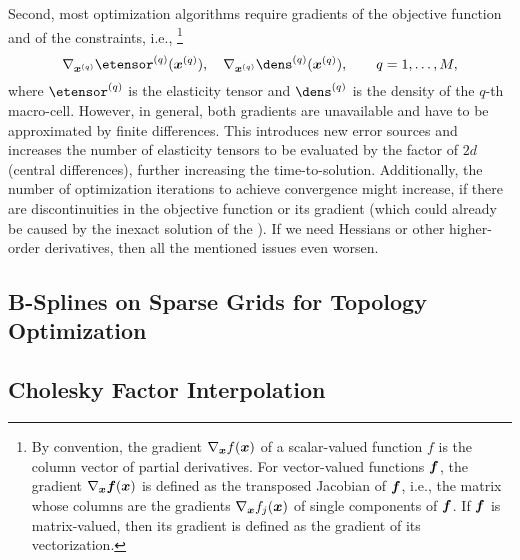 Second, most optimization algorithms require gradients of the
objective function and of the constraints, i.e.,%
\footnote{%
  By convention, the gradient $\nabla_{{\boldsymbol{x}}} f({\boldsymbol{x}})$ of a
  scalar-valued function $f$ is the column vector of partial derivatives.
  For vector-valued functions ${\boldsymbol{f}}$, the gradient $\nabla_{{\boldsymbol{x}}} {\boldsymbol{f}}({\boldsymbol{x}})$
  is defined as the transposed Jacobian of ${\boldsymbol{f}}$, i.e.,
  the matrix whose columns are the gradients $\nabla_{{\boldsymbol{x}}} f_j({\boldsymbol{x}})$ of
  single components of ${\boldsymbol{f}}$.
  If ${\boldsymbol{f}}$ is matrix-valued, then its gradient is defined as the
  gradient of its vectorization.%
}
\begin{equation}
  \nabla_{\*x^{(q)}} \etensor^{(q)}(\*x^{(q)}),\quad
  \nabla_{\*x^{(q)}} \dens^{(q)}(\*x^{(q)}),\qquad
  q = 1, \dotsc, M,
\end{equation}
where $\etensor^{(q)}$ is the elasticity tensor and
$\dens^{(q)}$ is the density of the $q$-th macro-cell.
However, in general, both gradients are unavailable and
have to be approximated by finite differences.
This introduces new error sources and
increases the number of elasticity tensors to be evaluated
by the factor of $2d$ (central differences),
further increasing the time-to-solution.
Additionally, the number of optimization iterations to
achieve convergence might increase,
if there are discontinuities in the objective function
or its gradient
(which could already be caused by the inexact solution of the \fem).
If we need Hessians or other higher-order derivatives,
then all the mentioned issues even worsen.



\subsection{B-Splines on Sparse Grids for Topology Optimization}
\label{sec:622BSplines}

\blindtext{}



\subsection{Cholesky Factor Interpolation}
\label{sec:623cholesky}

\blindtext{}















































